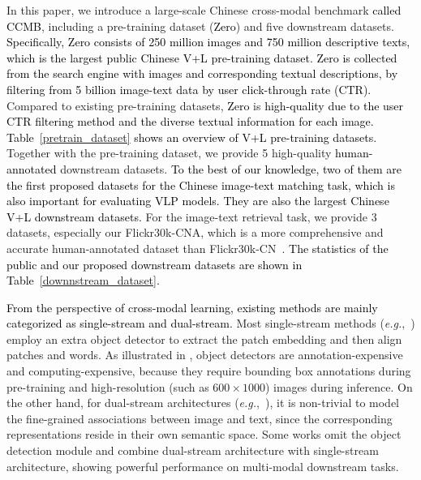 \documentclass[sigconf]{acmart}
\def\eg{\mbox{\textit{e.g.}, }}
\def\blue{\textcolor{black}}
\def\ldw{\textcolor{black}}
\def\mmxie{\textcolor{black}}
\def\mmcr{\textcolor{black}}
\begin{document}
In this paper, we introduce a large-scale Chinese cross-modal benchmark \blue{called CCMB}, including a pre-training dataset (\mmcr{Zero}) and five downstream datasets.
\blue{Specifically, \mmcr{Zero} consists of 250 million images and 750 million descriptive texts, which is the largest public Chinese V+L pre-training dataset. \mmcr{Zero} is collected from the search engine with images and corresponding textual descriptions, by filtering from 5 billion image-text data by user click-through rate (CTR).}
Compared to existing pre-training datasets, \mmcr{Zero} is \ldw{high-quality due to the user CTR filtering method and the diverse textual information for each image.} \blue{Table~\ref{pretrain_dataset} shows an overview of V+L pre-training datasets.}
Together with the pre-training dataset, we provide 5 high-quality \blue{human-annotated} downstream datasets.
\mmxie{To the best of our knowledge, two of them are the first proposed datasets for the Chinese image-text matching task, which is also important for evaluating VLP models. They are also the largest Chinese V+L downstream datasets.}
For the image-text retrieval task, we provide 3 datasets, 
especially our Flickr30k-CNA, which is a more comprehensive and accurate human-annotated dataset than Flickr30k-CN~\cite{flickr30k-cn}. \blue{The statistics of the public and our proposed downstream datasets are shown in Table~\ref{downnstream_dataset}.}







\mmxie{From the perspective of cross-modal learning, existing methods are mainly categorized as single-stream and dual-stream.} Most single-stream methods (\eg \cite{uniter,UNIMO,imagebert}) employ an extra object detector to extract the patch embedding and then align patches and words. As illustrated in \cite{ALBEF}, object detectors are annotation-expensive and computing-expensive, because they require bounding box annotations during pre-training and high-resolution (such as $600 \times 1000$) images during inference.
On the other hand, for dual-stream architectures (\eg \cite{CLIP,ALIGN,wenlan2}), it is non-trivial to model the fine-grained associations between image and text, since the corresponding representations reside in their own semantic space. 
Some works \cite{BLIP,ALBEF,FLAVA} omit the object detection module and combine dual-stream architecture with single-stream architecture, showing powerful performance on multi-modal downstream tasks.
\end{document}
